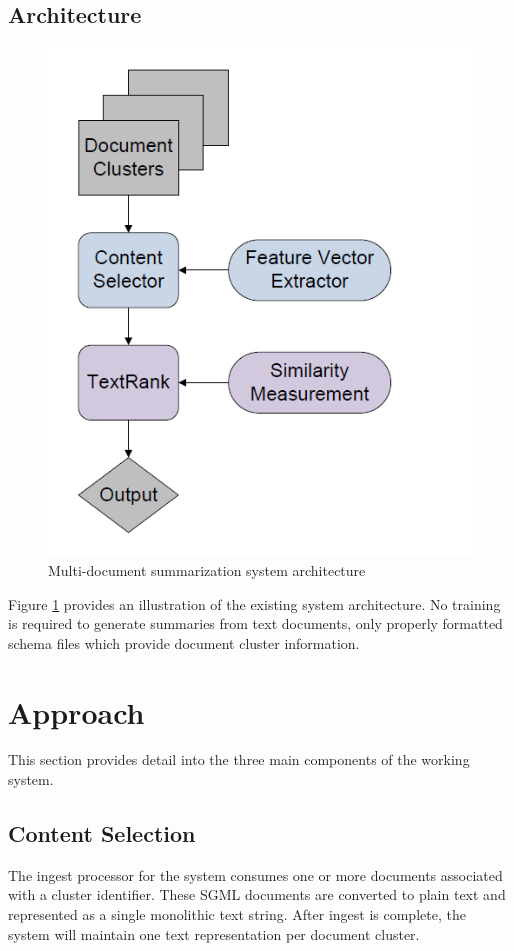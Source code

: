 \documentclass[11pt]{article}
\begin{document}
\subsection{Architecture}
\begin{figure}
  \includegraphics[width=\linewidth]{arch.PNG}
  \caption{Multi-document summarization system architecture}
  \label{fig:arch}
\end{figure}

Figure \ref{fig:arch} provides an illustration of the existing system architecture. No training is required to generate summaries from text documents, only properly formatted schema files which provide document cluster information.

\section{Approach}

This section provides detail into the three main components of the working system.

\subsection{Content Selection}
The ingest processor for the system consumes one or more documents associated with a cluster identifier. These SGML documents are converted to plain text and represented as a single monolithic text string. After ingest is complete, the system will maintain one text representation per document cluster.
\end{document}
